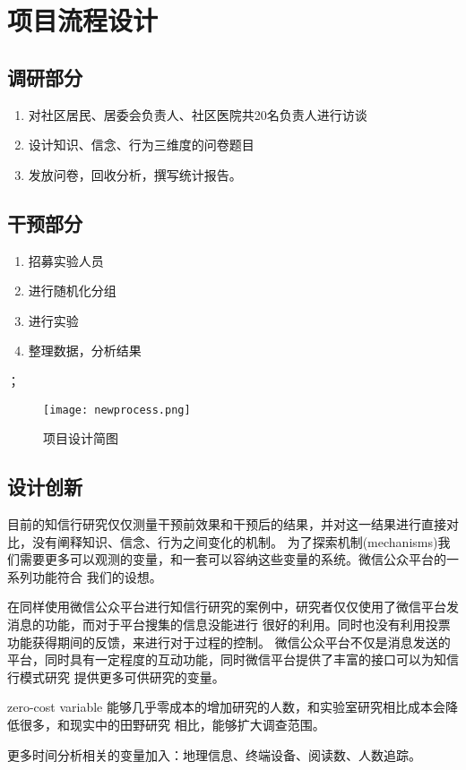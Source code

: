 \section{项目流程设计}
\subsection{调研部分}
\begin{enumerate}
    \item 对社区居民、居委会负责人、社区医院共20名负责人进行访谈
    \item 设计知识、信念、行为三维度的问卷题目
    \item 发放问卷，回收分析，撰写统计报告。
\end{enumerate}
\subsection{干预部分}
\begin{enumerate}
\item 招募实验人员
\item 进行随机化分组
\item 进行实验
\item 整理数据，分析结果
\end{enumerate}；
\begin{figure}[th]
	\texttt{[image: newprocess.png]}
	\centering
	\caption{项目设计简图}
\end{figure}
\subsection{设计创新}
目前的知信行研究仅仅测量干预前效果和干预后的结果，并对这一结果进行直接对比，没有阐释知识、信念、行为之间变化的机制。
为了探索机制(mechanisms)我们需要更多可以观测的变量，和一套可以容纳这些变量的系统。微信公众平台的一系列功能符合
我们的设想。

在同样使用微信公众平台进行知信行研究的案例中，研究者仅仅使用了微信平台发消息的功能，而对于平台搜集的信息没能进行
很好的利用。同时也没有利用投票功能获得期间的反馈，来进行对于过程的控制。
微信公众平台不仅是消息发送的平台，同时具有一定程度的互动功能，同时微信平台提供了丰富的接口可以为知信行模式研究
提供更多可供研究的变量。

zero-cost variable
能够几乎零成本的增加研究的人数，和实验室研究相比成本会降低很多，和现实中的田野研究
相比，能够扩大调查范围。

更多时间分析相关的变量加入：地理信息、终端设备、阅读数、人数追踪。